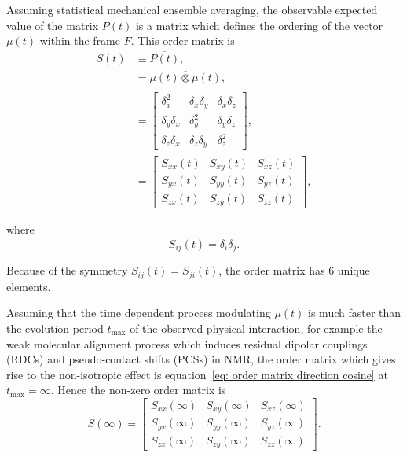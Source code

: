 Assuming statistical mechanical ensemble averaging, the observable expected value of the matrix $P(t)$ is a matrix which defines the ordering of the vector $\mu(t)$ within the frame $F$.
This order matrix is
\begin{subequations}
\begin{align}
    S(t) 
        &\equiv \overline{P(t)} , \\
        &= \overline{\mu(t) \otimes \mu(t)} , \label{eq: order matrix expected outer product} \\
        &= \overline{\begin{bmatrix}
                \delta_x^2       & \delta_x\delta_y & \delta_x\delta_z \\
                \delta_y\delta_x & \delta_y^2       & \delta_y\delta_z \\
                \delta_z\delta_x & \delta_z\delta_y & \delta_z^2
        \end{bmatrix}} , \label{eq: order matrix direction cosine} \\
        &= \begin{bmatrix}
            S_{xx}(t) & S_{xy}(t) & S_{xz}(t) \\
            S_{yx}(t) & S_{yy}(t) & S_{yz}(t) \\
            S_{zx}(t) & S_{zy}(t) & S_{zz}(t)
        \end{bmatrix} , \label{eq: order matrix}
\end{align}
\end{subequations}

where
\begin{equation}
    S_{ij}(t) = \overline{\delta_i \delta_j} .
\end{equation}

Because of the symmetry $S_{ij}(t) = S_{ji}(t)$, the order matrix has 6 unique elements.

Assuming that the time dependent process modulating $\mu(t)$ is much faster than the evolution period $t_{\textrm{max}}$ of the observed physical interaction, for example the weak molecular alignment process which induces residual dipolar couplings (RDCs) and pseudo-contact shifts (PCSs) in NMR, the order matrix which gives rise to the non-isotropic effect is equation~\ref{eq: order matrix direction cosine} at $t_{\textrm{max}} = \infty$.
Hence the non-zero order matrix is
\begin{equation}
    S(\infty) = \begin{bmatrix}
                S_{xx}(\infty) & S_{xy}(\infty) & S_{xz}(\infty) \\
                S_{yx}(\infty) & S_{yy}(\infty) & S_{yz}(\infty) \\
                S_{zx}(\infty) & S_{zy}(\infty) & S_{zz}(\infty)
              \end{bmatrix} .
\end{equation}




